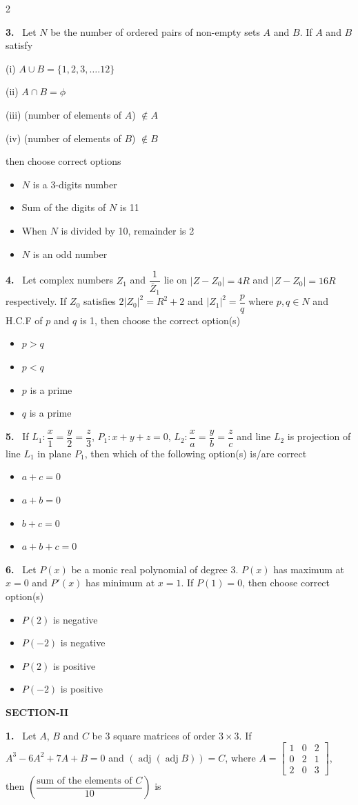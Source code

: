 \documentclass[10pt]{extarticle}
\newcommand{\sect}[1]{\par\smallskip\noindent\textbf{#1}\par}
\newcommand{\qn}[1]{\par\smallskip\noindent\textbf{#1.}~}
\newenvironment{qoptions}{\begin{itemize}[leftmargin=1.8em,itemsep=1pt,topsep=2pt,label={}]}{\end{itemize}}
\newcommand{\opt}[2]{\item[(#1)] #2}
\begin{document}
\begin{multicols}{2}
\qn{3} Let $N$ be the number of ordered pairs of non-empty sets $A$ and $B$. If $A$ and $B$ satisfy

(i) $A\cup B=\{1,2,3,\ldots.12\}$

(ii) $A\cap B=\phi$

(iii) (number of elements of $A$) $\notin A$

(iv) (number of elements of $B$) $\notin B$

then choose correct options
\begin{qoptions}
\opt{A}{$N$ is a 3-digits number}
\opt{B}{Sum of the digits of $N$ is 11}
\opt{C}{When $N$ is divided by 10, remainder is 2}
\opt{D}{$N$ is an odd number}
\end{qoptions}

\qn{4} Let complex numbers $Z_1$ and $\dfrac{1}{\bar Z_1}$ lie on $|Z-Z_0|=4R$ and $|Z-Z_0|=16R$ respectively. If $Z_0$ satisfies $2|Z_0|^2=R^2+2$ and $|Z_1|^2=\dfrac pq$ where $p,q\in N$ and H.C.F of $p$ and $q$ is 1, then choose the correct option(s)
\begin{qoptions}
\opt{A}{$p>q$}
\opt{B}{$p<q$}
\opt{C}{$p$ is a prime}
\opt{D}{$q$ is a prime}
\end{qoptions}

\qn{5} If $L_1:\dfrac x1=\dfrac y2=\dfrac z3$, $P_1:x+y+z=0$, $L_2:\dfrac xa=\dfrac yb=\dfrac zc$ and line $L_2$ is projection of line $L_1$ in plane $P_1$, then which of the following option(s) is/are correct
\begin{qoptions}
\opt{A}{$a+c=0$}
\opt{B}{$a+b=0$}
\opt{C}{$b+c=0$}
\opt{D}{$a+b+c=0$}
\end{qoptions}

\qn{6} Let $P(x)$ be a monic real polynomial of degree 3. $P(x)$ has maximum at $x=0$ and $P'(x)$ has minimum at $x=1$. If $P(1)=0$, then choose correct option(s)
\begin{qoptions}
\opt{A}{$P(2)$ is negative}
\opt{B}{$P(-2)$ is negative}
\opt{C}{$P(2)$ is positive}
\opt{D}{$P(-2)$ is positive}
\end{qoptions}

\sect{SECTION-II}
\qn{1} Let $A$, $B$ and $C$ be 3 square matrices of order $3\times3$. If $A^3-6A^2+7A+B=0$ and $(\operatorname{adj}(\operatorname{adj}B))=C$, where $A=\begin{bmatrix}1&0&2\\0&2&1\\2&0&3\end{bmatrix}$, then $\left(\dfrac{\text{sum of the elements of }C}{10}\right)$ is


\end{multicols}
\end{document}
